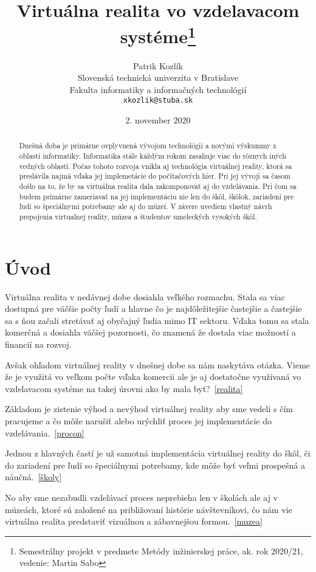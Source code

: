 \documentclass[10pt,twoside,slovak,a4paper]{article}
\title{Virtuálna realita vo vzdelavacom systéme\thanks{Semestrálny projekt v predmete Metódy inžinierskej práce, ak. rok 2020/21, vedenie: Martin Sabo}} %
\author{Patrik Kozlík\\[2pt]
	{\small Slovenská technická univerzita v Bratislave}\\
	{\small Fakulta informatiky a informačných technológií}\\
	{\small \texttt{xkozlik@stuba.sk}}
	}
\date{\small 2. november 2020} %
\begin{document}
\maketitle

\begin{abstract}
Dnešná doba je primárne ovplyvnená vývojom technológii a novými výskummy z oblasti informatiky. Informatika stále káždým rokom zasahuje
viac do rôznych iných vedných oblastí. Počas tohoto rozvoja vnikla aj technológia virtuálnej reality, ktorá sa preslávila najmä vďaka jej
implemetácie do počítačových hier. Pri jej vývoji sa časom došlo na to, že by sa virtuálna realita dala zakomponovať aj do vzdelávania. 
Pri čom sa budem primárne zameriavať na jej implementáciu nie len do škôl, škôlok, zariadení pre ľudí so špeciálnymi potrebamy ale aj do múzeí. V závere uvediem vlastný návrh prepojenia virtualnej reality, múzea a študentov umeleckých vysokých škôl.   	
\end{abstract}



\section{Úvod}

Virtuálna realita v nedávnej dobe dosiahla veľkého rozmachu. Stala sa viac dostupná pre väčšie počty ľudí a hlavne čo je najdôležitejšie 
častejšie a častejšie sa s ňou začali stretávať aj obyčajný ľudia mimo IT sektoru. Vďaka tomu sa stala komerčná a dosiahla väčšej pozornosti,
čo znamená že dostala viac možností a financií na rozvoj. 

Avšak ohľadom virtuálnej reality v dnešnej dobe sa nám naskytáva otázka. Vieme že je využitá vo veľkom počte vďaka komercii ale je aj dostatočne využívaná vo vzdelavacom systéme na takej úrovni ako by mala byť?~\ref{realita}

Základom je zistenie výhod a nevýhod virtuálnej reality aby sme vedeli s čím pracujeme a čo môže narušiť alebo urýchliť proces 
jej implementácie do vzdelávania.~\ref{procon}

Jednou z hlavných častí je už samotná implementácia virtuálnej reality do škôl, či do zariadení pre ľudí so špeciálnymi potrebamy,
kde môže byť veľmi prospešná a náučná.~\ref{školy}

No aby sme nezabudli vzdelávací proces neprebieha len v školách ale aj v múzeách, ktoré sú založené na približovaní histórie návštevníkovi, čo nám vie virtuálna realita predstaviť vizuálnou a zábavnejšou formou.~\ref{muzea}
\end{document}
